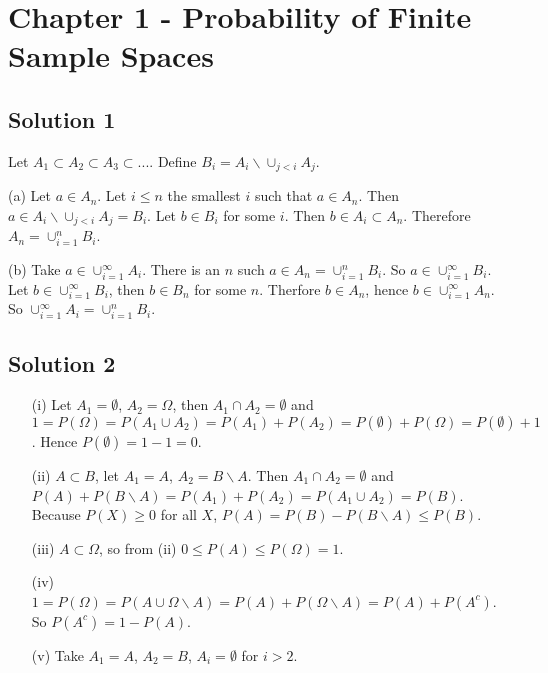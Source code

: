 \section*{Chapter 1 - Probability of Finite Sample Spaces}

\subsection*{Solution 1}

Let $A_1 \subset A_2 \subset A_3 \subset ...$.
Define $B_i = A_i \backslash \cup_{j < i} A_j$.

(a) Let $a \in A_n$.
Let $i \leq n$ the smallest $i$ such that $a \in A_n$.
Then $a \in A_i \backslash \cup_{j < i} A_j = B_i$.
Let $b \in B_i$ for some $i$.
Then $b \in A_i \subset A_n$.
Therefore $A_n = \cup_{i = 1}^n B_i$.

(b) Take $a \in \cup_{i = 1}^{\infty} A_i$.
There is an $n$ such $a \in A_n = \cup_{i = 1}^n B_i$.
So $a \in \cup_{i = 1}^{\infty} B_i$.
Let $b \in \cup_{i = 1}^{\infty} B_i$, then $b \in B_n$ for some $n$.
Therfore $b \in A_n$, hence $b \in \cup_{i=1}^{\infty} A_n$.
So $\cup_{i=1}^{\infty} A_i = \cup_{i=1}^n B_i$.


\subsection*{Solution 2}

\begin{itemize}
    \item[(i)] Let $A_1 = \emptyset$, $A_2 = \Omega$, then $A_1 \cap A_2 = \emptyset$ and $1 = P(\Omega) = P(A_1 \cup A_2) = P(A_1) + P(A_2) = P(\emptyset) + P(\Omega) = P(\emptyset) + 1$.
        Hence $P(\emptyset) = 1 - 1 = 0$.
    \item[(ii)] $A \subset B$, let $A_1 = A$, $A_2 = B \backslash A$. Then $A_1 \cap A_2 = \emptyset$ and $P(A) + P(B \backslash A) = P(A_1) + P(A_2) = P(A_1 \cup A_2) = P(B)$.
        Because $P(X) \geq 0$ for all $X$, $P(A) = P(B) - P(B \backslash A) \leq P(B)$.
    \item[(iii)] $A \subset \Omega$, so from (ii) $0 \leq P(A) \leq P(\Omega) = 1$.
    \item[(iv)] $1 = P(\Omega) = P(A \cup \Omega \backslash A) = P(A) + P(\Omega \backslash A) = P(A) + P(A^c)$.
        So $P(A^c) = 1 - P(A)$.
    \item[(v)] Take $A_1 = A$, $A_2 = B$, $A_i = \emptyset$ for $i > 2$.
\end{itemize}


